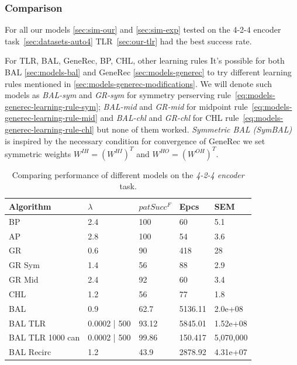 \subsubsection{Comparison} 
\label{sec:tlr-auto4-cmp} 

For all our models \ref{sec:sim-our} and \ref{sec:sim-exp} tested on the 4-2-4 encoder task~\ref{sec:datasets-auto4} TLR~\ref{sec:our-tlr} had the best success rate. 

For TLR, BAL, GeneRec, BP, CHL, other learning rules
\label{sec:our-learning-rules}
It's possible for both BAL \ref{sec:models-bal} and GeneRec \ref{sec:models-generec} to try different learning rules mentioned in \ref{sec:models-generec-modifications}. We will denote such models as \emph{BAL-sym} and \emph{GR-sym} for symmetry perserving rule~\ref{eq:models-generec-learning-rule-sym}; \emph{BAL-mid} and \emph{GR-mid} for midpoint rule~\ref{eq:models-generec-learning-rule-mid} and \emph{BAL-chl} and \emph{GR-chl} for CHL rule~\ref{eq:models-generec-learning-rule-chl} but none of them worked. 
\label{sec:our-bal-sym} 
\emph{Symmetric BAL (SymBAL)} is inspired by the necessary condition for convergence of GeneRec \citep{o1996bio} we set symmetric weights $W^{IH} = (W^{HI})^T$ and $W^{HO} = (W^{OH})^T$. 

\begin{table}[H] 
  \centering
    \begin{tabular}{|l|l|l|l|l|}
    \hline
    Algorithm&$\lambda$&$patSucc^F$&Epcs&SEM \\
    \hline
    BP&2.4&100&60&5.1\\
    \hline
    AP&2.8&100&54&3.6\\
    \hline
    GR&0.6&90&418&28\\
    \hline
    GR Sym&1.4&56&88&2.9\\
    \hline
    GR Mid&2.4&92&60&3.4\\
    \hline
    CHL&1.2&56&77&1.8\\
    \hline
    BAL&0.9&62.7& 5136.11&2.0e+08\\
    \hline
    BAL TLR&0.0002 | 500&93.12&5845.01&1.52e+08\\
    \hline
    BAL TLR 1000 can&0.0002 | 500&99.86&150.417&5,070,000\\
    \hline
    BAL Recirc&1.2&43.9&2878.92&4.31e+07\\
    \hline
    \end{tabular}
  \caption{Comparing performance of different models on the \emph{4-2-4 encoder} task.} 
  \label{tab:results-cmp-auto4}
\end{table}

